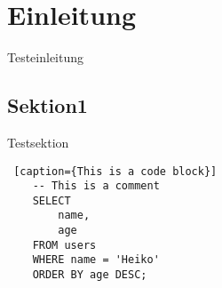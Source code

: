 \chapter{Einleitung}
Testeinleitung

\section{Sektion1}
Testsektion \cite{Nuijten2023}

\begin{lstlisting} [caption={This is a code block}]
    -- This is a comment
    SELECT
        name,
        age
    FROM users
    WHERE name = 'Heiko'
    ORDER BY age DESC;
    \end{lstlisting}